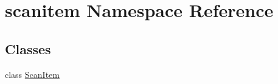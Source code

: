 \hypertarget{namespacescanitem}{}\section{scanitem Namespace Reference}
\label{namespacescanitem}
\subsection*{Classes}
\begin{DoxyCompactItemize}
\item 
class \hyperlink{classscanitem_1_1ScanItem}{Scan\+Item}
\end{DoxyCompactItemize}

